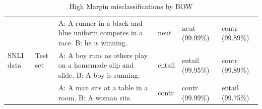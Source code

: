 \documentclass[10pt,letterpaper]{article}
\begin{document}
\begin{table}[ht!]
\begin{tabular}{||l|l|p{85mm}|l|p{15mm}|p{15mm}||}

  
\multirow{3}{*}{\parbox{1.2cm}{ SNLI data}} & \multirow{3}{*}{Test set } & A: A runner in a black and blue uniform competes in a race.\newline
 B: he is winning. & neut & neut (99.99\%) & contr (99.89\%) \\
 \cline{3-6}
&& A: A boy runs as others play on a homemade slip and slide. \newline
 B: A boy is running. & entail & entail (99.95\%) & contr (99.89\%) \\
 \cline{3-6}
 && A: A man sits at a table in a room. \newline
 B: A woman sits. & contr & contr (99.99\%) & entail (99.75\%) \\

 \hline
  \end{tabular}
  \caption{High Margin misclassifications by BOW}
  \label{tab:highMargin}
\end{table}
\end{document}

